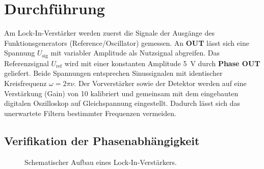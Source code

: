\section{Durchführung}
\label{sec:durchführung}

Am Lock-In\hspace{0.1ex}-\hspace{-0.25ex}Verstärker werden zuerst die Signale der Ausgänge des
Funktionsgenerators (Reference/Oscillator) gemessen. An \scriptsize\textbf{OUT}\normalsize{} lässt sich eine
Spannung $U_{\! \text{sig}}$ mit variabler Amplitude als Nutzsignal abgreifen. Das Referenzsignal
$U_{\! \text{ref}}$ wird mit einer konstanten Amplitude \qty{5}{\volt} durch
\textbf{\small{Phase \scriptsize{OUT}}}\normalsize{} geliefert. Beide Spannungen entsprechen Sinussignalen mit
identischer Kreisfrequenz $\omega = 2\pi\nu$. Der Vorverstärker sowie der Detektor
werden auf eine Verstärkung (Gain) von \num{10} kalibriert und gemeinsam mit dem eingebauten
digitalen Oszilloskop auf Gleichspannung eingestellt. Dadurch lässt
sich das unerwartete Filtern bestimmter Frequenzen vermeiden.

\subsection{Verifikation der Phasenabhängigkeit}

\begin{figure}[H]
	\centering
	\begin{tikzpicture}
		
	\end{tikzpicture}
	\vspace{1.23ex}
	\caption{Schematischer Aufbau eines Lock-In\hspace{0.1ex}-\hspace{-0.25ex}Verstärkers.}
	\label{fig:lock-in}
\end{figure}

\enlargethispage{\baselineskip}

